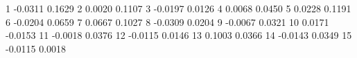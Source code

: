 1 -0.0311 0.1629
2 0.0020 0.1107
3 -0.0197 0.0126
4 0.0068 0.0450
5 0.0228 0.1191
6 -0.0204 0.0659
7 0.0667 0.1027
8 -0.0309 0.0204
9 -0.0067 0.0321
10 0.0171 -0.0153
11 -0.0018 0.0376
12 -0.0115 0.0146
13 0.1003 0.0366
14 -0.0143 0.0349
15 -0.0115 0.0018
